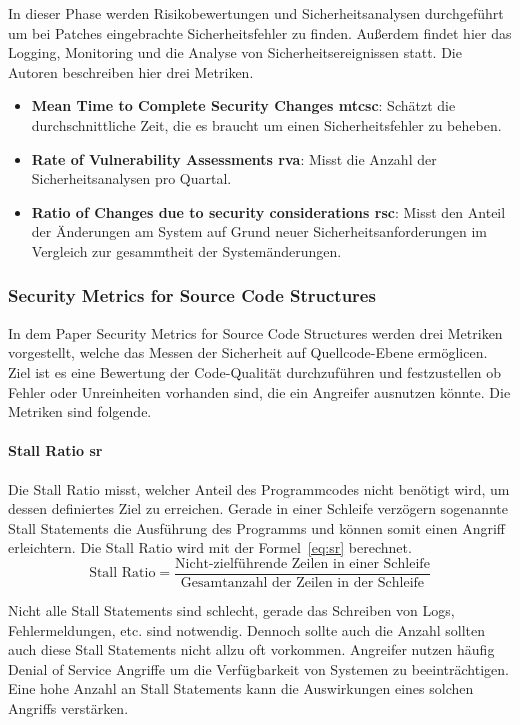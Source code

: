 \documentclass[12pt, a4paper, ngerman]{article}
\begin{document}
In dieser Phase werden Risikobewertungen und Sicherheitsanalysen durchgeführt um bei Patches eingebrachte Sicherheitsfehler zu finden.
Außerdem findet hier das Logging, Monitoring und die Analyse von Sicherheitsereignissen statt.
Die Autoren beschreiben hier drei Metriken.
\begin{itemize}
  \item \textbf{Mean Time to Complete Security Changes \ac{mtcsc}}: Schätzt die durchschnittliche Zeit, die es braucht um einen Sicherheitsfehler zu beheben. 
  \item \textbf{Rate of Vulnerability Assessments \ac{rva}}: Misst die Anzahl der Sicherheitsanalysen pro Quartal.
  \item \textbf{Ratio of Changes due to security considerations \ac{rsc}}: Misst den Anteil der Änderungen am System auf Grund neuer Sicherheitsanforderungen im Vergleich zur gesammtheit der Systemänderungen.
\end{itemize}

\subsubsection{Security Metrics for Source Code Structures~\cite{Chowdhury_Chan_Zulkernine_2008}}

In dem Paper Security Metrics for Source Code Structures werden drei Metriken vorgestellt, 
welche das Messen der Sicherheit auf Quellcode-Ebene ermöglicen.
Ziel ist es eine Bewertung der Code-Qualität durchzuführen und 
festzustellen ob Fehler oder Unreinheiten vorhanden sind, die ein Angreifer ausnutzen könnte.
Die Metriken sind folgende.

\paragraph{Stall Ratio \ac{sr}}

Die Stall Ratio misst, welcher Anteil des Programmcodes nicht benötigt wird, um dessen definiertes Ziel zu erreichen.
Gerade in einer Schleife verzögern sogenannte Stall Statements die Ausführung des Programms und können somit einen Angriff erleichtern.
Die Stall Ratio wird mit der Formel~\ref{eq:sr} berechnet.
\begin{equation} \label{eq:sr}
  \text{Stall Ratio} = \frac{ \text{Nicht-zielführende Zeilen in einer Schleife} }{ \text{Gesamtanzahl der Zeilen in der Schleife} }
\end{equation}

Nicht alle Stall Statements sind schlecht, gerade das Schreiben von Logs, Fehlermeldungen, etc. sind notwendig.
Dennoch sollte auch die Anzahl sollten auch diese Stall Statements nicht allzu oft vorkommen.
Angreifer nutzen häufig Denial of Service Angriffe um die Verfügbarkeit von Systemen zu beeinträchtigen.
Eine hohe Anzahl an Stall Statements kann die Auswirkungen eines solchen Angriffs verstärken.
\end{document}
